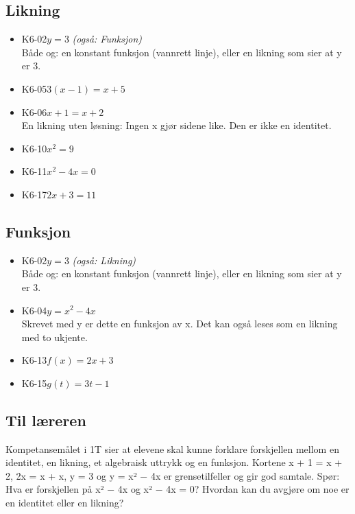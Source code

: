 \documentclass[11pt,a4paper]{article}
\begin{document}
\subsection*{Likning}
\begin{itemize}[leftmargin=1.2em, itemsep=0.35em]
\item \textsf{\small K6-02}\quad $y = 3$ \emph{(også: Funksjon)}\\{\small\color{dempet}Både og: en konstant funksjon (vannrett linje), eller en likning som sier at y er 3.}
\item \textsf{\small K6-05}\quad $3(x - 1) = x + 5$
\item \textsf{\small K6-06}\quad $x + 1 = x + 2$\\{\small\color{dempet}En likning uten løsning: Ingen x gjør sidene like. Den er ikke en identitet.}
\item \textsf{\small K6-10}\quad $x^2 = 9$
\item \textsf{\small K6-11}\quad $x^2 - 4x = 0$
\item \textsf{\small K6-17}\quad $2x + 3 = 11$
\end{itemize}
\subsection*{Funksjon}
\begin{itemize}[leftmargin=1.2em, itemsep=0.35em]
\item \textsf{\small K6-02}\quad $y = 3$ \emph{(også: Likning)}\\{\small\color{dempet}Både og: en konstant funksjon (vannrett linje), eller en likning som sier at y er 3.}
\item \textsf{\small K6-04}\quad $y = x^2 - 4x$\\{\small\color{dempet}Skrevet med y er dette en funksjon av x. Det kan også leses som en likning med to ukjente.}
\item \textsf{\small K6-13}\quad $f(x) = 2x + 3$
\item \textsf{\small K6-15}\quad $g(t) = 3t - 1$
\end{itemize}
\subsection*{Til læreren}
Kompetansemålet i 1T sier at elevene skal kunne forklare forskjellen mellom en identitet, en likning, et algebraisk uttrykk og en funksjon. Kortene x + 1 = x + 2, 2x = x + x, y = 3 og y = x² − 4x er grensetilfeller og gir god samtale. Spør: Hva er forskjellen på x² − 4x og x² − 4x = 0? Hvordan kan du avgjøre om noe er en identitet eller en likning?
\end{document}
